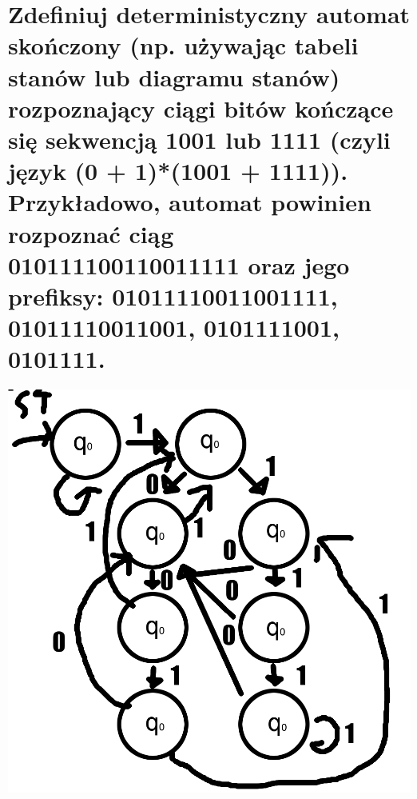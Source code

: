 \documentclass{article}
\begin{document}
\section{Zdefiniuj deterministyczny automat skończony (np. używając tabeli stanów lub diagramu stanów) rozpoznający ciągi bitów kończące się sekwencją 1001 lub 1111 (czyli język (0 + 1)*(1001 + 1111)). Przykładowo, automat powinien rozpoznać ciąg 010111100110011111 oraz jego prefiksy: 01011110011001111, 01011110011001, 0101111001, 0101111.}
\begin{center}
	\includegraphics[scale=0.6]{"L09Z02.png"}
\end{center}
\end{document}
